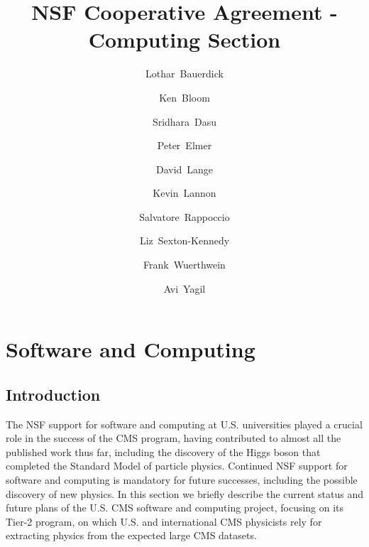\documentclass[11pt,a4paper]{article}
\begin{document}
\title{NSF Cooperative Agreement - Computing Section}

\author[1]{Lothar~Bauerdick}

\author[2]{Ken~Bloom}

\author[3]{Sridhara~Dasu}

\author[4]{Peter~Elmer}

\author[5]{David~Lange}

\author[6]{Kevin~Lannon}

\author[7]{Salvatore~Rappoccio}

\author[1]{Liz~Sexton-Kennedy}

\author[8]{Frank~Wuerthwein}

\author[8]{Avi~Yagil}


\renewcommand\Authands{ and }

\maketitle

\newpage

\section{Software and Computing}

\subsection{Introduction}

The NSF support for software and computing at U.S. universities
played a crucial role in the success of the CMS program, having
contributed to almost all the published work thus far, including the
discovery of the Higgs boson that completed the Standard Model of
particle physics.  Continued NSF support for software and computing is
mandatory for future successes, including the possible discovery of new
physics.  In this section we briefly describe the current status and
future plans of the U.S. CMS software and computing project, focusing on
its Tier-2 program, on which U.S. and international CMS physicists rely
for extracting physics from the expected large CMS datasets.
\end{document}
